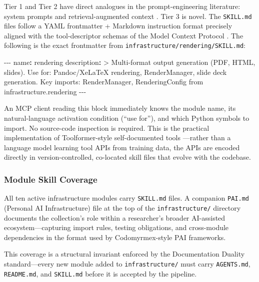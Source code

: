 \documentclass[
]{article}
\newenvironment{Shaded}{}{}
\newcommand{\AttributeTok}[1]{\textcolor[rgb]{0.49,0.56,0.16}{#1}}
\newcommand{\CharTok}[1]{\textcolor[rgb]{0.25,0.44,0.63}{#1}}
\newcommand{\FunctionTok}[1]{\textcolor[rgb]{0.02,0.16,0.49}{#1}}
\newcommand{\KeywordTok}[1]{\textcolor[rgb]{0.00,0.44,0.13}{\textbf{#1}}}
\newcommand{\NormalTok}[1]{#1}
\newcommand{\PreprocessorTok}[1]{\textcolor[rgb]{0.74,0.48,0.00}{#1}}
\begin{document}
Tier 1 and Tier 2 have direct analogues in the prompt-engineering
literature: system prompts and retrieval-augmented context
\citep{lau2025aicoding}. Tier 3 is novel. The \texttt{SKILL.md} files
follow a YAML frontmatter + Markdown instruction format precisely
aligned with the tool-descriptor schemas of the Model Context Protocol
\citep{anthropic2024mcp}. The following is the exact frontmatter from
\texttt{infrastructure/rendering/SKILL.md}:

\begin{Shaded}
\begin{Highlighting}[]
\PreprocessorTok{{-}{-}{-}}
\FunctionTok{name}\KeywordTok{:}\AttributeTok{ rendering}
\FunctionTok{description}\KeywordTok{: }\CharTok{\textgreater{}}
\NormalTok{  Multi{-}format output generation (PDF, HTML, slides).}
\NormalTok{  Use for: Pandoc/XeLaTeX rendering, RenderManager, slide deck generation.}
\NormalTok{  Key imports: RenderManager, RenderingConfig from infrastructure.rendering}
\PreprocessorTok{{-}{-}{-}}
\end{Highlighting}
\end{Shaded}

An MCP client reading this block immediately knows the module name, its
natural-language activation condition (``use for''), and which Python
symbols to import. No source-code inspection is required. This is the
practical implementation of Toolformer-style self-documented tools
\citep{schick2023toolformer}---rather than a language model learning
tool APIs from training data, the APIs are encoded directly in
version-controlled, co-located skill files that evolve with the
codebase.

\subsubsection{Module Skill Coverage}\label{module-skill-coverage}

All ten active infrastructure modules carry \texttt{SKILL.md} files. A
companion \texttt{PAI.md} (Personal AI Infrastructure) file at the top
of the \texttt{infrastructure/} directory documents the collection's
role within a researcher's broader AI-assisted ecosystem---capturing
import rules, testing obligations, and cross-module dependencies in the
format used by Codomyrmex-style PAI frameworks.

This coverage is a structural invariant enforced by the Documentation
Duality standard---every new module added to \texttt{infrastructure/}
must carry \texttt{AGENTS.md}, \texttt{README.md}, and \texttt{SKILL.md}
before it is accepted by the pipeline.
\end{document}

